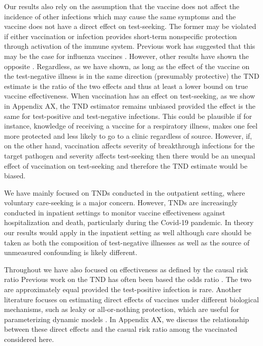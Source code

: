 \documentclass[11pt]{article}
\begin{document}
Our results also rely on the assumption that the vaccine does not affect the incidence of other infections which may cause the same symptoms and the vaccine does not have a direct effect on test-seeking. The former may be violated if either vaccination or infection provides short-term nonspecific protection through activation of the immune system. Previous work has suggested that this may be the case for influenza vaccines \cite{cowling_increased_2012}. However, other results have shown the opposite \cite{sundaram_influenza_2013}. Regardless, as we have shown, as long as the effect of the vaccine on the test-negative illness is in the same direction (presumably protective) the TND estimate is the ratio of the two effects and thus at least a lower bound on true vaccine effectiveness. When vaccination has an effect on test-seeking, as we show in Appendix AX, the TND estimator remains unbiased provided the effect is the same for test-positive and test-negative infections. This could be plausible if for instance, knowledge of receiving a vaccine for a respiratory illness, makes one feel more protected and less likely to go to a clinic regardless of source. However, if, on the other hand, vaccination affects severity of breakthrough infections for the target pathogen and severity affects test-seeking then there would be an unequal effect of vaccination on test-seeking and therefore the TND estimate would be biased.

We have mainly focused on TNDs conducted in the outpatient setting, where voluntary care-seeking is a major concern. However, TNDs are increasingly conducted in inpatient settings to monitor vaccine effectiveness against hospitalization and death, particularly during the Covid-19 pandemic. In theory our results would apply in the inpatient setting as well although care should be taken as both the composition of test-negative illnesses as well as the source of unmeasured confounding is likely different. %

Throughout we have also focused on effectiveness as defined by the causal risk ratio Previous work on the TND has often been based the odds ratio \cite{sullivan_theoretical_2016}. The two are approximately equal provided the test-positive infection is rare. Another literature focuses on estimating direct effects of vaccines under different biological mechanisms, such as leaky or all-or-nothing protection, which are useful for parameterizing dynamic models \cite{lewnard_measurement_2018,lewnard_theoretical_2021}. In Appendix AX, we discuss the relationship between these direct effects and the casual risk ratio among the vaccinated considered here.
\end{document}
